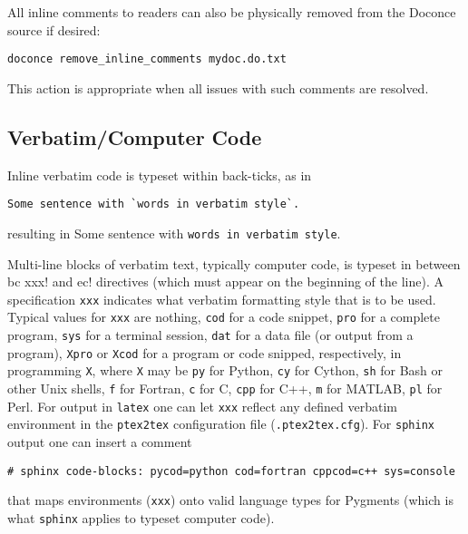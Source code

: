 \documentclass[twoside]{article}
\begin{document}
All inline comments to readers can also be physically
removed from the Doconce source if desired:
\begin{Verbatim}
doconce remove_inline_comments mydoc.do.txt
\end{Verbatim}
This action is appropriate when all issues with such comments are resolved.

\subsection{Verbatim/Computer Code}

Inline verbatim code is typeset within back-ticks, as in
\begin{Verbatim}
Some sentence with `words in verbatim style`.
\end{Verbatim}
resulting in Some sentence with {\fontsize{10pt}{10pt}\verb!words in verbatim style!}.

Multi-line blocks of verbatim text, typically computer code, is typeset
in between {\fontsize{10pt}{10pt}\verb!!bc xxx!} and {\fontsize{10pt}{10pt}\verb!!ec!} directives (which must appear on the
beginning of the line). A specification {\fontsize{10pt}{10pt}\verb!xxx!} indicates what verbatim
formatting style that is to be used. Typical values for {\fontsize{10pt}{10pt}\verb!xxx!} are
nothing, {\fontsize{10pt}{10pt}\verb!cod!} for a code snippet, {\fontsize{10pt}{10pt}\verb!pro!} for a complete program,
{\fontsize{10pt}{10pt}\verb!sys!} for a terminal session, {\fontsize{10pt}{10pt}\verb!dat!} for a data file (or output from a
program),
{\fontsize{10pt}{10pt}\verb!Xpro!} or {\fontsize{10pt}{10pt}\verb!Xcod!} for a program or code snipped, respectively,
in programming {\fontsize{10pt}{10pt}\verb!X!}, where {\fontsize{10pt}{10pt}\verb!X!} may be {\fontsize{10pt}{10pt}\verb!py!} for Python,
{\fontsize{10pt}{10pt}\verb!cy!} for Cython, {\fontsize{10pt}{10pt}\verb!sh!} for Bash or other Unix shells,
{\fontsize{10pt}{10pt}\verb!f!} for Fortran, {\fontsize{10pt}{10pt}\verb!c!} for C, {\fontsize{10pt}{10pt}\verb!cpp!} for C++, {\fontsize{10pt}{10pt}\verb!m!} for MATLAB,
{\fontsize{10pt}{10pt}\verb!pl!} for Perl. For output in {\fontsize{10pt}{10pt}\verb!latex!} one can let {\fontsize{10pt}{10pt}\verb!xxx!} reflect any
defined verbatim environment in the {\fontsize{10pt}{10pt}\verb!ptex2tex!} configuration file
({\fontsize{10pt}{10pt}\verb!.ptex2tex.cfg!}). For {\fontsize{10pt}{10pt}\verb!sphinx!} output one can insert a comment
\begin{Verbatim}
# sphinx code-blocks: pycod=python cod=fortran cppcod=c++ sys=console
\end{Verbatim}
that maps environments ({\fontsize{10pt}{10pt}\verb!xxx!}) onto valid language types for
Pygments (which is what {\fontsize{10pt}{10pt}\verb!sphinx!} applies to typeset computer code).
\end{document}
